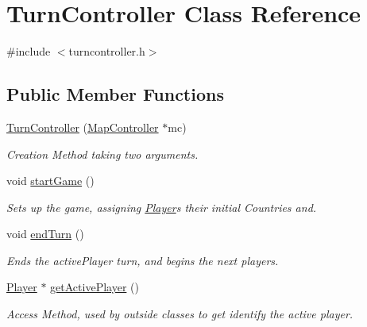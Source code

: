 \hypertarget{class_turn_controller}{}\section{Turn\+Controller Class Reference}
\label{class_turn_controller}


{\ttfamily \#include $<$turncontroller.\+h$>$}

\subsection*{Public Member Functions}
\begin{DoxyCompactItemize}
\item 
\hyperlink{class_turn_controller_aa9e4a3c63544a55349a11c49f5a27d92}{Turn\+Controller} (\hyperlink{class_map_controller}{Map\+Controller} $\ast$mc)
\begin{DoxyCompactList}\small\item\em Creation Method taking two arguments. \end{DoxyCompactList}\item 
\hypertarget{class_turn_controller_af0bf05ca649fe7b08a6fee6f7d0f4594}{}void \hyperlink{class_turn_controller_af0bf05ca649fe7b08a6fee6f7d0f4594}{start\+Game} ()\label{class_turn_controller_af0bf05ca649fe7b08a6fee6f7d0f4594}

\begin{DoxyCompactList}\small\item\em Sets up the game, assigning \hyperlink{class_player}{Player}\textquotesingle{}s their initial Countries and. \end{DoxyCompactList}\item 
\hypertarget{class_turn_controller_accc451d934fd5983486182ecf2c5e86a}{}void \hyperlink{class_turn_controller_accc451d934fd5983486182ecf2c5e86a}{end\+Turn} ()\label{class_turn_controller_accc451d934fd5983486182ecf2c5e86a}

\begin{DoxyCompactList}\small\item\em Ends the active\+Player turn, and begins the next players. \end{DoxyCompactList}\item 
\hyperlink{class_player}{Player} $\ast$ \hyperlink{class_turn_controller_a7facfb08df4a5bc9eef6af8eb4debc46}{get\+Active\+Player} ()
\begin{DoxyCompactList}\small\item\em Access Method, used by outside classes to get identify the active player. \end{DoxyCompactList}\end{DoxyCompactItemize}

